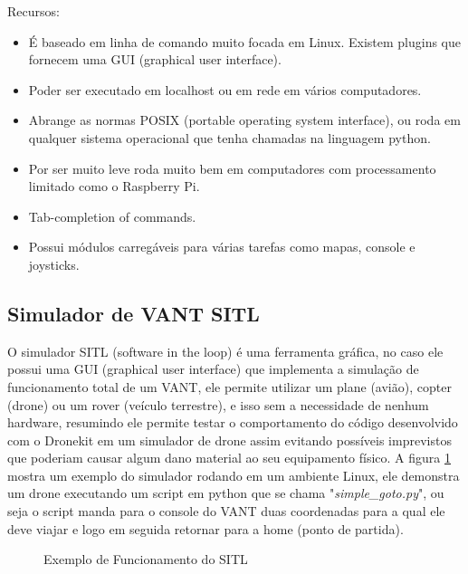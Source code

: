 Recursos:
\begin{itemize}
    \item É baseado em linha de comando muito focada em Linux. Existem plugins que fornecem uma GUI (graphical user interface).
    \item Poder ser executado em localhost ou em rede em vários computadores.
    \item Abrange as normas POSIX (portable operating system interface), ou roda em qualquer sistema operacional que tenha chamadas na linguagem python.
    \item Por ser muito leve roda muito bem em computadores com processamento limitado como o Raspberry Pi.
    \item Tab-completion of commands.
    \item Possui módulos carregáveis para várias tarefas como mapas, console e joysticks.
\end{itemize}

\subsection{Simulador de VANT SITL}
O simulador SITL (software in the loop) é uma ferramenta gráfica, no caso ele possui uma GUI (graphical user interface) que implementa a simulação de funcionamento total de um VANT, ele permite utilizar um plane (avião), copter (drone) ou um rover (veículo terrestre), e isso sem a necessidade de nenhum hardware, resumindo ele permite testar o comportamento do código desenvolvido com o Dronekit em um simulador de drone assim evitando possíveis imprevistos que poderiam causar algum dano material ao seu equipamento físico. A figura \ref{fig:sitl} mostra um exemplo do simulador rodando em um ambiente Linux, ele demonstra um drone executando um script em python que se chama "\textit{simple\_goto.py}", ou seja o script manda para o console do VANT duas coordenadas para a qual ele deve viajar e logo em seguida retornar para a home (ponto de partida).

%
\begin{figure}[H]
	\centering
	\caption{Exemplo de Funcionamento do SITL}
	\fontsize{9pt}{12pt}\selectfont
	\def\svgwidth{15cm}
	
	\label{fig:sitl}
\end{figure}


